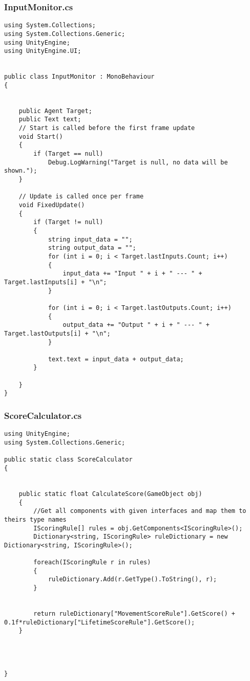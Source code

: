 \documentclass[12pt,a4paper]{article}
\begin{document}
\subsubsection*{InputMonitor.cs}
\begin{lstlisting}
using System.Collections;
using System.Collections.Generic;
using UnityEngine;
using UnityEngine.UI;


public class InputMonitor : MonoBehaviour
{


    public Agent Target;
    public Text text;
    // Start is called before the first frame update
    void Start()
    {
        if (Target == null)
            Debug.LogWarning("Target is null, no data will be shown.");
    }

    // Update is called once per frame
    void FixedUpdate()
    {
        if (Target != null)
        {
            string input_data = "";
            string output_data = "";
            for (int i = 0; i < Target.lastInputs.Count; i++)
            {
                input_data += "Input " + i + " --- " + Target.lastInputs[i] + "\n";
            }

            for (int i = 0; i < Target.lastOutputs.Count; i++)
            {
                output_data += "Output " + i + " --- " + Target.lastOutputs[i] + "\n";
            }

            text.text = input_data + output_data;
        }

    }
}
\end{lstlisting}
\pagebreak


\subsubsection*{ScoreCalculator.cs}
\begin{lstlisting}
using UnityEngine;
using System.Collections.Generic;

public static class ScoreCalculator
{

    
    public static float CalculateScore(GameObject obj)
    {
        //Get all components with given interfaces and map them to theirs type names
        IScoringRule[] rules = obj.GetComponents<IScoringRule>();
        Dictionary<string, IScoringRule> ruleDictionary = new Dictionary<string, IScoringRule>();
        
        foreach(IScoringRule r in rules)
        {
            ruleDictionary.Add(r.GetType().ToString(), r);
        }

        
        return ruleDictionary["MovementScoreRule"].GetScore() + 0.1f*ruleDictionary["LifetimeScoreRule"].GetScore();
    }


     

}\end{lstlisting}
\pagebreak
\end{document}
